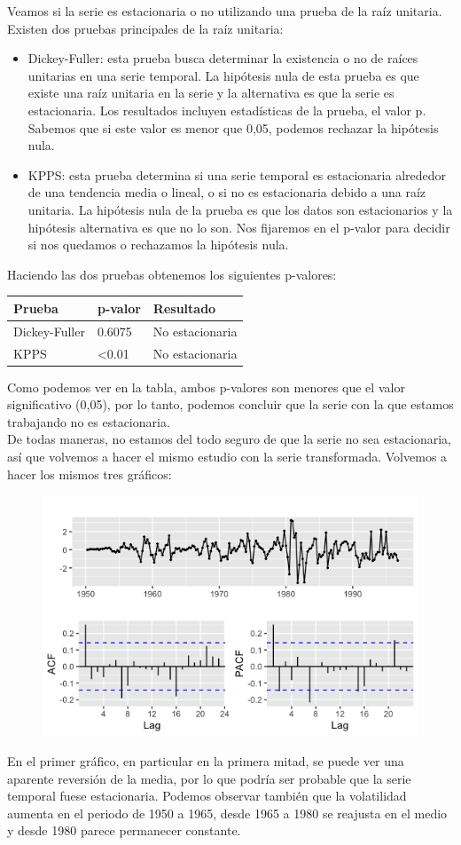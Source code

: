 \documentclass[a4paper,]{article}
\begin{document}
Veamos si la serie es estacionaria o no utilizando una prueba de la raíz unitaria. Existen dos pruebas principales de la raíz unitaria:
\begin{itemize}
    \item Dickey-Fuller: esta prueba busca determinar la existencia o no de raíces unitarias en una serie temporal. La hipótesis nula de esta prueba es que existe una raíz unitaria en la serie y la alternativa es que la serie es estacionaria. Los resultados incluyen estadísticas de la prueba, el valor p. Sabemos que si este valor es menor que 0,05, podemos rechazar la hipótesis nula.
    \item KPPS: esta prueba determina si una serie temporal es estacionaria alrededor de una tendencia media o lineal, o si no es estacionaria debido a una raíz unitaria. La hipótesis nula de la prueba es que los datos son estacionarios y la hipótesis alternativa es que no lo son. Nos fijaremos en el p-valor para decidir si nos quedamos o rechazamos la hipótesis nula.
\end{itemize}
Haciendo las dos pruebas obtenemos los siguientes p-valores:
\begin{table}[H]
\centering
\begin{tabular}{|l|l|l|}
\hline
\rowcolor[HTML]{C0C0C0} 
{\color[HTML]{000000} Prueba}         & {\color[HTML]{000000} p-valor} & {\color[HTML]{000000} Resultado} \\ \hline
\cellcolor[HTML]{EFEFEF}Dickey-Fuller & 0.6075                         & No estacionaria                  \\ \hline
\cellcolor[HTML]{EFEFEF}KPPS          & \textless{}0.01                & No estacionaria                  \\ \hline
\end{tabular}
\end{table}
Como podemos ver en la tabla, ambos p-valores son menores que el valor significativo (0,05), por lo tanto, podemos concluir que la serie con la que estamos trabajando no es estacionaria. \\

De todas maneras, no estamos del todo seguro de que la serie no sea estacionaria, así que volvemos a hacer el mismo estudio con la serie transformada. Volvemos a hacer los mismos tres gráficos:
\begin{figure}[H]
    \centering
    \includegraphics[width=0.5\linewidth]{1aa.png}
\end{figure}
En el primer gráfico, en particular en la primera mitad, se puede ver una aparente reversión de la media, por lo que podría ser probable que la serie temporal fuese estacionaria. Podemos observar también que la volatilidad aumenta en el periodo de 1950 a 1965, desde 1965 a 1980 se reajusta en el medio y desde 1980 parece permanecer constante. \\
\end{document}
